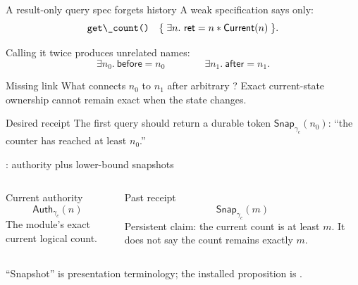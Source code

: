 \documentclass[aspectratio=169,10pt]{beamer}
\newcommand{\Sep}{\mathbin{*}}
\newcommand{\AuthC}[1]{\mathsf{Auth}_{\gamma_c}(#1)}
\newcommand{\Snap}[1]{\mathsf{Snap}_{\gamma_c}(#1)}
\newcommand{\code}[1]{\texttt{\detokenize{#1}}}
\begin{document}
\begin{frame}{A result-only query spec forgets history}
  A weak specification says only:
  \[
    \code{get\_count()}\quad\{\;\exists n.\ \mathsf{ret}=n\Sep\mathsf{Current}(n)\;\}.
  \]

  Calling it twice produces unrelated names:
  \[
    \exists n_0.\ \mathsf{before}=n_0
    \qquad\qquad
    \exists n_1.\ \mathsf{after}=n_1.
  \]

  \begin{alertblock}{Missing link}
    What connects \(n_0\) to \(n_1\) after arbitrary \code{f}? Exact current-state ownership cannot remain exact when the state changes.
  \end{alertblock}

  \begin{exampleblock}{Desired receipt}
    The first query should return a durable token \(\Snap{n_0}\): “the counter has reached at least \(n_0\).”
  \end{exampleblock}
\end{frame}

\begin{frame}{\code{mono\_nat}: authority plus lower-bound snapshots}
  \begin{columns}[T,onlytextwidth]
      \begin{block}{Current authority}
        \[
          \AuthC{n}
        \]
        The module's exact current logical count.
      \end{block}
      \begin{exampleblock}{Past receipt}
        \[
          \Snap{m}
        \]
        Persistent claim: the current count is at least \(m\). It does not say the count remains exactly \(m\).
      \end{exampleblock}
  \end{columns}

  \vspace{0.25cm}
  \begin{center}
  \end{center}

  \scriptsize “Snapshot” is presentation terminology; the installed proposition is \code{mono_nat_lb_own}.
\end{frame}
\end{document}
